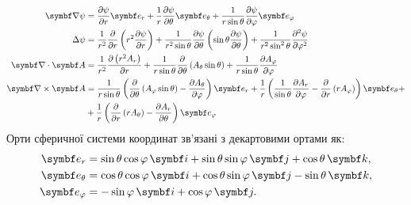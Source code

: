 \begin{align}\label{spheric}
    \vect{\nabla}\psi & = \frac{\partial \psi}{\partial r} \vect{e}_{r} + \frac{1}{r}\frac{\partial \psi}{\partial \theta} \vect{e}_{\theta} + \frac{1}{r\sin\theta}\frac{\partial \psi}{\partial \phi} \vect{e}_{\phi}                                                                                                            \\
	\Laplasian\psi    & = \frac{1}{r^2} \frac{\partial}{\partial r} \left( r^2 \frac{\partial \psi}{\partial r} \right) + \frac{1}{r^2 \sin \theta} \frac{\partial \psi}{\partial \theta} \left( \sin \theta \frac{\partial \psi}{\partial \theta} \right) + \frac{1}{r^2\sin^2 \theta} \frac{\partial^2 \psi}{\partial \phi^2} \\
	\divg\vect{A}     & =\frac{1}{r^2}\frac{\partial \left(r^2A_r\right)}{\partial r}
	+
	\frac{1}{r\sin \theta }\frac{\partial}{\partial \theta }\left(A_{\theta }\sin \theta \right)
	+
	\frac{1}{r\sin\theta}\frac{\partial A_{\phi}}{\partial \phi }                                                                                                                                                                                                                                                            \\
	\rot\vect{A}      & = \frac{1}{r\sin \theta }\left(\frac{\partial}{\partial \theta }\left(A_{\phi }\sin \theta \right)-\frac{\partial A_{\theta }}{\partial \phi }\right)\vect{e}_{r}
	+
	\frac{1}{r}\left(\frac{1}{\sin \theta }\frac{\partial A_{r}}{\partial \phi }-\frac{\partial}{\partial r}\left(rA_{\phi }\right)\right)\vect{e}_{\theta}
	+ \nonumber                                                                                                                                                                                                                                                                                                                    \\
	                  & + \frac{1}{r}\left(\frac{\partial}{\partial r}\left(rA_{\theta }\right)-\frac{\partial A_{r}}{\partial \theta }\right)\vect{e}_{\phi}
\end{align}
Орти сферичної системи координат зв'язані з декартовими ортами як:
\begin{align}\label{}
    \vect{e}_r &= \sin\theta\cos\phi\, \vect{i} + \sin\theta\sin\phi\, \vect{j} + \cos\theta\, \vect{k}, \\
    \vect{e}_{\theta} &= \cos\theta\cos\phi\, \vect{i} + \cos\theta\sin\phi\, \vect{j} - \sin\theta\, \vect{k}, \\
    \vect{e}_{\phi} &= -\sin\phi\, \vect{i} + \cos\phi\, \vect{j}. \\
\end{align}

